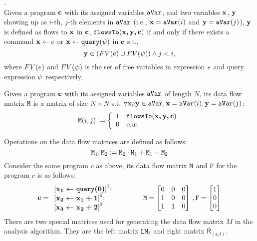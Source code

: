 \documentclass[a4paper,11pt]{article}
\begin{document}
\begin{defn}.
\\
Given a program  $\boldsymbol{\mathbf{c}}$ with its assigned variables $\mathtt{aVar}$,
and two variables $\boldsymbol{\mathbf{x}}$, $\boldsymbol{\mathbf{y}}$ showing up as $i$-th, $j$-th elements in $\mathtt{aVar}$ 
(i.e., $\boldsymbol{\mathbf{x}} = \mathtt{aVar}(i)$ and $\boldsymbol{\mathbf{y}} = \mathtt{aVar}(j)$),
$\boldsymbol{\mathbf{y}}$ is defined as flows to $\boldsymbol{\mathbf{x}}$ in $\boldsymbol{\mathbf{c}}$, $\mathtt{flowsTo}(\boldsymbol{\mathbf{x, y, c}})$ if and only if 
there exists
a command $\mathrel{ \boldsymbol{\mathbf{x}} \leftarrow e }$ or $\mathrel{ \boldsymbol{\mathbf{x}} \leftarrow {\tt query}(\psi) }$ in $\boldsymbol{\mathbf{c}}$ s.t.,
\[
	\boldsymbol{\mathbf{y}} \in (FV(e) \cup FV(\psi)) \land j < i,
\]
where $FV(e)$ and $FV(\psi)$ is the set of free variables in 
expression $e$ and query expression $\psi$ respectively.
\end{defn}
%
%
\begin{defn}
Given a program  $\boldsymbol{\mathbf{c}}$ with its assigned variables $\mathtt{aVar}$ of length $N$,
its data flow matrix $\mathtt{M}$ is a matrix of size $N \times N$ s.t.
$\forall \boldsymbol{\mathbf{x, y}} \in \mathtt{aVar}, \boldsymbol{\mathbf{x}} = \mathtt{aVar}(i), \boldsymbol{\mathbf{y}} = \mathtt{aVar}(j)$:
%
\[
\Mtrix(i, j) :=
\left\{
\begin{array}{ll}
1	&	\flowsto(\ssa{x, y, c}) \\
0	& o.w.
\end{array}
\right.
\]
%
\end{defn}
%
Operations on the data flow matrices are defined as follows:
%
\begin{equation}
\mathtt{M}_1 ; \mathtt{M}_2 
:= \mathtt{M}_2 \cdot \mathtt{M}_1 + \mathtt{M}_1 + \mathtt{M}_2
\end{equation}
%
Consider the same program $c$ as above, its data flow matrix $\mathtt{M}$ and $\mathtt{F}$ for the program $c$ is as follows:
$$
\ssa{c} = 
\begin{array}{l}
\left[\ssa{\assign {x_1} {\query(0)}}	\right]^1;
\\
\left[\ssa{\assign {x_2} {x_1 + 1}}		\right]^2;
\\
\left[\ssa{\assign {x_3} {x_2 + 2}}		\right]^3
\end{array}
~~~~~~~~~~~~
\Mtrix
=  \left[ 
\begin{matrix}
 0 & 0 & 0 \\
 1 & 0 & 0 \\
 1 & 1 & 0 \\
\end{matrix} \right] ~ , 
\flag = \left [ \begin{matrix}
1 \\
0 \\
0 \\
\end{matrix} \right ]
$$
%
There are two special matrices used for generating the data flow matrix $M$ in the analysis algorithm. They are the left matrix $\mathtt{LM}_i$ and right matrix $\mathsf{R_{(e, i)}}$.
\end{document}
